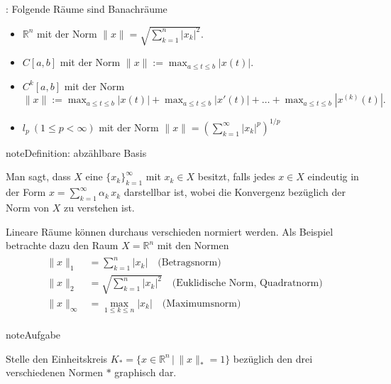 \documentclass[letterpaper,10pt,english]{jupyterBook}
\begin{document}
: Folgende Räume sind Banachräume
\begin{itemize}
\item {} 
\(\mathbb{R}^n\) mit der Norm \(\|x\| = \sqrt{\sum_{k=1}^n |x_k|^2}\).

\item {} 
\(C[a,b]\) mit der Norm \(\|x\| := \max_{a\le t \le b} |x(t)|\).

\item {} 
\(C^k[a,b]\) mit der Norm \(\|x\| := \max_{a\le t \le b} |x(t)| + \max_{a\le t \le b} |x'(t)| + \ldots + \max_{a\le t \le b} |x^{(k)}(t)|.\)

\item {} 
\(l_p\ (1\le p < \infty)\) mit der Norm \(\|x\| = \left(\sum_{k=1}^{\infty} |x_k|^p \right)^{1/p}\)

\end{itemize}

\begin{sphinxadmonition}{note}{Definition: abzählbare Basis}

Man sagt, dass \(X\) eine  \(\{x_k\}_{k=1}^{\infty}\) mit \(x_k \in X\) besitzt, falls jedes \(x\in X\) eindeutig in der Form \(x = \sum_{k=1}^{\infty} \alpha_k\,x_k\) darstellbar ist, wobei die Konvergenz bezüglich der Norm von \(X\) zu verstehen ist.
\end{sphinxadmonition}

Lineare Räume können durchaus verschieden normiert werden. Als Beispiel betrachte dazu den Raum \(X=\mathbb{R}^n\) mit den Normen
\begin{equation*}
\begin{split}\begin{split}
\|x\|_1 & = \sum_{k=1}^n |x_k|\quad\text{(Betragsnorm)}\\
\|x\|_2 & = \sqrt{\sum_{k=1}^n |x_k|^2}\quad\text{(Euklidische Norm, Quadratnorm)}\\
\|x\|_{\infty} & = \max_{1\le k \le n} |x_k|\quad\text{(Maximumsnorm)}\end{split}\end{split}
\end{equation*}
\begin{sphinxadmonition}{note}{Aufgabe}

Stelle den Einheitskreis \(K_{*} = \{x\in\mathbb{R}^n\, \big|\, \|x\|_{*} = 1\}\) bezüglich den drei verschiedenen Normen \(*\) graphisch dar.
\end{sphinxadmonition}
\end{document}
